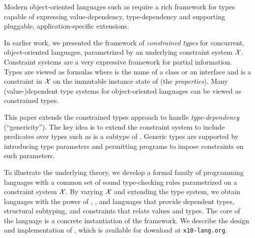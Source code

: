 Modern object-oriented languages such as \Xten require a rich framework
for types capable of expressing value-dependency, type-dependency
and supporting pluggable, application-specific extensions.

In earlier work, we presented the framework of \emph{constrained
types} for concurrent, object-oriented languages, parametrized by
an underlying constraint system $\cal X$. Constraint systems are a
very expressive framework for partial information. Types are viewed
as formulas  where  is the name of a class
or an interface and  is a constraint in $\cal X$ on the
immutable instance state of  (the \emph{properties}).
Many (value-)dependent type systems for object-oriented languages
can be viewed as constrained types.

This paper extends the constrained types approach to handle
\emph{type-dependency} (``genericity''). The key idea is to extend
the constraint system to include predicates over types such as
 is a subtype of .  Generic types are supported
by introducing type parameters and permitting programs to impose
constraints on such parameters.

To illustrate the underlying theory, we develop a formal family of
programming languages with a common set of sound type-checking rules
parametrized on a constraint system $\cal X$.  By varying $\cal X$
and extending the type system, we obtain languages with the power
of \FJ, \FGJ, and languages that provide dependent types, structural
subtyping, and constraints that relate values and types.  The core
of the \Xten language is a concrete instantiation of the framework.  We
describe the design and implementation of \Xten, which is available
for download at \texttt{x10-lang.org}.

